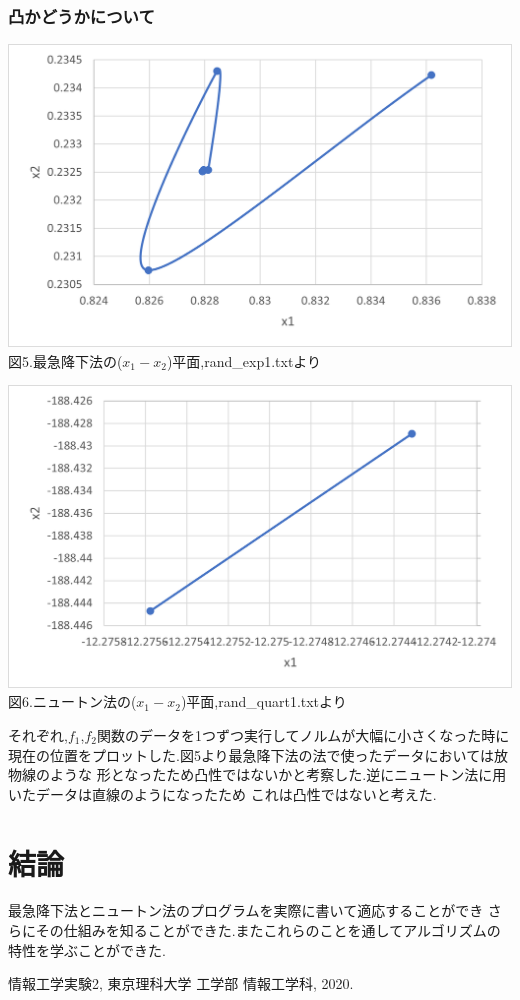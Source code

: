 \documentclass[12pt]{jarticle}
\begin{document}
\subsubsection{凸かどうかについて}
\begin{center}
    \includegraphics[width=15cm,clip]{5.png}\\
    図5.最急降下法の($x_1-x_2$)平面,rand\_exp1.txtより\\
\end{center}
\begin{center}
    \includegraphics[width=15cm,clip]{6.png}\\
    図6.ニュートン法の($x_1-x_2$)平面,rand\_quart1.txtより\\
\end{center}
それぞれ,$f_1$,$f_2$関数のデータを1つずつ実行してノルムが大幅に小さくなった時に
現在の位置をプロットした.図5より最急降下法の法で使ったデータにおいては放物線のような
形となったため凸性ではないかと考察した.逆にニュートン法に用いたデータは直線のようになったため
これは凸性ではないと考えた.
\section{結論}
最急降下法とニュートン法のプログラムを実際に書いて適応することができ
さらにその仕組みを知ることができた.またこれらのことを通してアルゴリズムの特性を学ぶことができた.
\begin{thebibliography}{99}
\label{sannkoubunnkenn_chapter}
情報工学実験2,
東京理科大学 工学部 情報工学科, 2020.
\end{thebibliography}
\clearpage
\appendix
\end{document}
